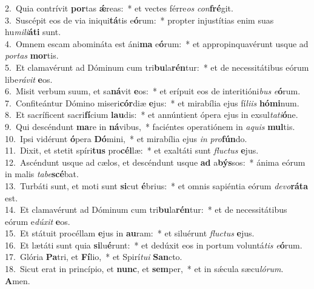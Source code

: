 {2.~}Quia contrívit \textbf{por}tas \textbf{ǽ}reas:~* et vectes férre\textit{os} \textit{con}\textbf{fré}git.\\
{3.~}Suscépit eos de via iniqui\textbf{tá}tis e\textbf{ó}rum:~* propter injustítias enim suas hu\textit{mi}\textit{li}\textbf{á}\textbf{ti} sunt.\\
{4.~}Omnem escam abomináta est áni\textbf{ma} e\textbf{ó}rum:~* et appropinquavérunt usque ad \textit{por}\textit{tas} \textbf{mor}tis.\\
{5.~}Et clamavérunt ad Dóminum cum tri\textbf{bu}la\textbf{rén}tur:~* et de necessitátibus eórum libe\textit{rá}\textit{vit} \textbf{e}os.\\
{6.~}Misit verbum suum, et sa\textbf{ná}vit \textbf{e}os:~* et erípuit eos de interitióni\textit{bus} \textit{e}\textbf{ó}rum.\\
{7.~}Confiteántur Dómino miseri\textbf{cór}diæ \textbf{e}jus:~* et mirabília ejus fí\textit{li}\textit{is} \textbf{hó}\textbf{mi}num.\\
{8.~}Et sacríficent sacri\textbf{fí}cium \textbf{lau}dis:~* et annúntient ópera ejus in exsul\textit{ta}\textit{ti}\textbf{ó}ne.\\
{9.~}Qui descéndunt \textbf{ma}re in \textbf{ná}vibus,~* faciéntes operatiónem in \textit{a}\textit{quis} \textbf{mul}tis.\\
{10.~}Ipsi vidérunt \textbf{ó}pera \textbf{Dó}mini,~* et mirabília ejus \textit{in} \textit{pro}\textbf{fún}do.\\
{11.~}Dixit, et stetit spíri\textbf{tus} pro\textbf{cél}læ:~* et exaltáti sunt \textit{flu}\textit{ctus} \textbf{e}jus.\\
{12.~}Ascéndunt usque ad cælos, et descéndunt usque \textbf{ad} a\textbf{býs}sos:~* ánima eórum in malis \textit{ta}\textit{be}\textbf{scé}bat.\\
{13.~}Turbáti sunt, et moti sunt \textbf{si}cut \textbf{é}brius:~* et omnis sapiéntia eórum \textit{de}\textit{vo}\textbf{rá}\textbf{ta} est.\\
{14.~}Et clamavérunt ad Dóminum cum tri\textbf{bu}la\textbf{rén}tur:~* et de necessitátibus eórum e\textit{dú}\textit{xit} \textbf{e}os.\\
{15.~}Et státuit procéllam \textbf{e}jus in \textbf{au}ram:~* et siluérunt \textit{flu}\textit{ctus} \textbf{e}jus.\\
{16.~}Et lætáti sunt quia \textbf{si}lu\textbf{é}runt:~* et dedúxit eos in portum voluntá\textit{tis} \textit{e}\textbf{ó}rum.\\
{17.~}Glória \textbf{Pa}tri, et \textbf{Fí}lio,~* et Spirí\textit{tu}\textit{i} \textbf{San}cto.\\
{18.~}Sicut erat in princípio, et \textbf{nunc}, et \textbf{sem}per,~* et in sǽcula sæcu\textit{ló}\textit{rum}. \textbf{A}men.\\

